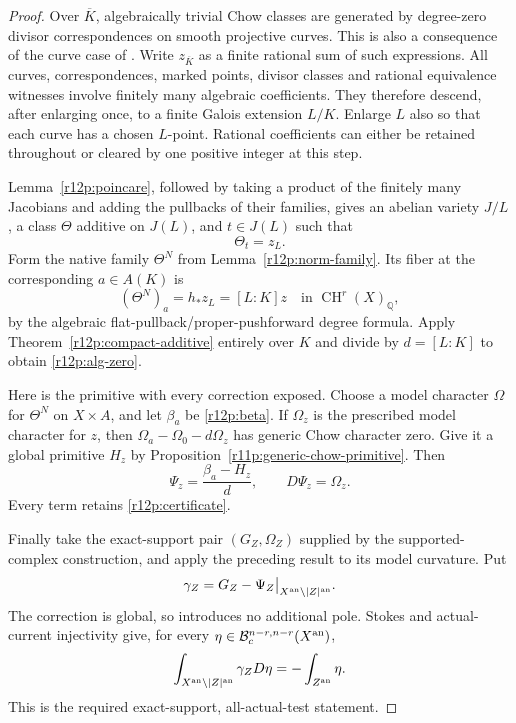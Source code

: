 \documentclass[11pt]{article}
\theoremstyle{definition}
\theoremstyle{remark}
\numberwithin{equation}{section}
\begin{document}
\begin{proof}
Over $\overline K$, algebraically trivial Chow classes are generated
by degree-zero divisor correspondences on smooth projective curves.
This is also a consequence of the curve case of
\cite[Theorems 1--2, Proposition 3.14]{ACMV}.  Write $z_{\overline K}$
as a finite rational sum of such expressions.  All curves,
correspondences, marked points, divisor classes and rational
equivalence witnesses involve finitely many algebraic coefficients.
They therefore descend, after enlarging once, to a finite Galois
extension $L/K$.  Enlarge $L$ also so that each curve has a chosen
$L$-point.  Rational coefficients can either be retained throughout
or cleared by one positive integer at this step.

Lemma~\ref{r12p:poincare}, followed by taking a product of the
finitely many Jacobians and adding the pullbacks of their families,
gives an abelian variety $J/L$, a class $\Theta$ additive on $J(L)$,
and $t\in J(L)$ such that
\[
                              \Theta_t=z_L.
\]
Form the native family $\Theta^N$ from
Lemma~\ref{r12p:norm-family}.  Its fiber at the corresponding
$a\in A(K)$ is
\[
        (\Theta^N)_a=h_*z_L=[L:K]z
                 \quad\text{in }\operatorname{CH}^r(X)_{\mathbb Q},
\tag{R12.P13}\label{r12p:degree-norm}
\]
by the algebraic flat-pullback/proper-pushforward degree formula.
Apply Theorem~\ref{r12p:compact-additive} entirely over $K$ and
divide by $d=[L:K]$ to obtain \eqref{r12p:alg-zero}.

Here is the primitive with every correction exposed.  Choose a
model character $\Omega$ for $\Theta^N$ on $X\times A$, and let
$\beta_a$ be \eqref{r12p:beta}.  If $\Omega_z$ is the prescribed
model character for $z$, then
$\Omega_a-\Omega_0-d\Omega_z$ has generic Chow character zero.
Give it a global primitive $H_z$ by Proposition~\ref{r11p:generic-chow-primitive}.  Then
\[
             \Psi_z=\frac{\beta_a-H_z}{d},
             \qquad D\Psi_z=\Omega_z.
\tag{R12.P14}\label{r12p:final-primitive}
\]
Every term retains \eqref{r12p:certificate}.

Finally take the exact-support pair $(G_Z,\Omega_Z)$ supplied by
the supported-complex construction, and apply the preceding result
to its model curvature.  Put
\[
       \gamma_Z=G_Z-\Psi_Z\big|_{X^{\rm an}\setminus|Z|^{\rm an}}.
\]
The correction is global, so introduces no additional pole.  Stokes
and actual-current injectivity give, for every
$\eta\in\mathcal B_c^{n-r,n-r}(X^{\rm an})$,
\[
 \int_{X^{\rm an}\setminus|Z|^{\rm an}}\gamma_ZD\eta
                         =-\int_{Z^{\rm an}}\eta.
\]
This is the required exact-support, all-actual-test statement.

\end{proof}
\end{document}
